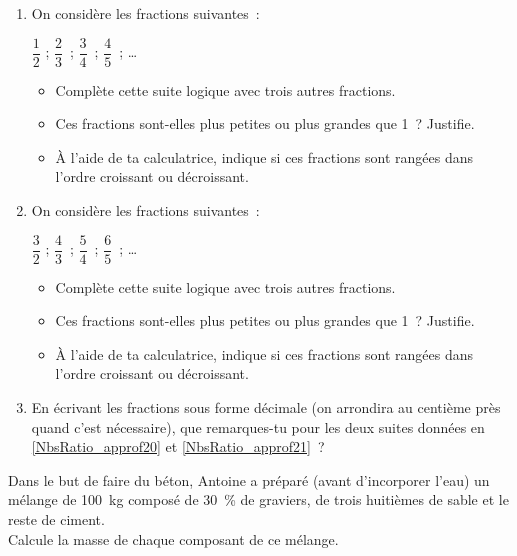\begin{exercice}
\begin{enumerate}
 \item On considère les fractions suivantes : \label{NbsRatio_approf20}
  \vspace{0.2cm} 
 \begin{center} $\dfrac{1}{2}$ ; $\dfrac{2}{3}$ ; $\dfrac{3}{4}$ ; $\dfrac{4}{5}$ ; \ldots \end{center}
 \begin{itemize}
  \item Complète cette suite logique avec trois autres fractions.
  \item Ces fractions sont-elles plus petites ou plus grandes que 1 ? Justifie.
  \item À l'aide de ta calculatrice, indique si ces fractions sont rangées dans l'ordre croissant ou décroissant.
  \end{itemize}
 \item On considère les fractions suivantes : \label{NbsRatio_approf21}
  \vspace{0.2cm} 
  \begin{center} $\dfrac{3}{2}$ ; $\dfrac{4}{3}$ ; $\dfrac{5}{4}$ ; $\dfrac{6}{5}$ ; \ldots \end{center}
 \begin{itemize}
  \item Complète cette suite logique avec trois autres fractions.
  \item Ces fractions sont-elles plus petites ou plus grandes que 1 ? Justifie.
  \item À l'aide de ta calculatrice, indique si ces fractions sont rangées dans l'ordre croissant ou décroissant.
  \end{itemize}
 \item En écrivant les fractions sous forme décimale (on arrondira au centième près quand c'est nécessaire), que remarques-tu pour les deux suites données en \ref{NbsRatio_approf20} et \ref{NbsRatio_approf21} ?
 \end{enumerate}
\end{exercice}


\begin{exercice}
Dans le but de faire du béton, Antoine a préparé (avant d'incorporer l'eau) un mélange de 100 kg composé de 30 \% de graviers, de trois huitièmes de sable et le reste de ciment. \\[0.5em]
Calcule la masse de chaque composant de ce mélange.
\end{exercice}


